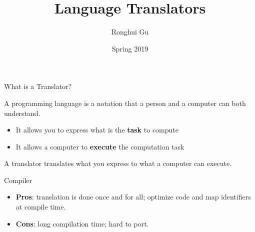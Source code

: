 \documentclass{plt}
\title{Language Translators}
\author{Ronghui Gu}
\institute{Columbia University}
\date{Spring 2019}
\begin{document}
\frame{\titlepage
}

\begin{frame}[fragile]{What is a Translator?}

A programming language is a notation that  a person and a computer can both understand.
\begin{itemize}

\item It allows you to express what is the \textbf{task} to compute

\item It allows a computer to \textbf{execute} the computation task

\end{itemize}


\alert{A translator translates what you express to what a computer can execute.}

\end{frame}


\begin{frame}[fragile,t]{Compiler}

\begin{center}
\end{center}


\begin{itemize}

\item \textbf{Pros}: translation is done once and for all; 
optimize code and map identifiers at compile time.

\item \textbf{Cons}: long compilation time; hard to port.

\end{itemize}

\end{frame}
\end{document}
